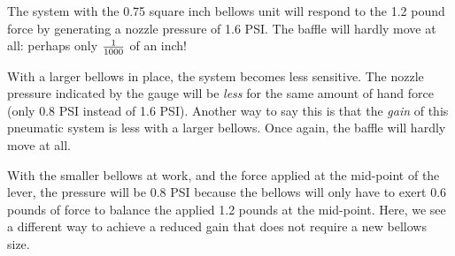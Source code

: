 
The system with the 0.75 square inch bellows unit will respond to the 1.2 pound force by generating a nozzle pressure of 1.6 PSI.  The baffle will hardly move at all: perhaps only $1 \over 1000$ of an inch!

\vskip 10pt

With a larger bellows in place, the system becomes less sensitive.  The nozzle pressure indicated by the gauge will be {\it less} for the same amount of hand force (only 0.8 PSI instead of 1.6 PSI).  Another way to say this is that the {\it gain} of this pneumatic system is less with a larger bellows.  Once again, the baffle will hardly move at all.

\vskip 10pt

With the smaller bellows at work, and the force applied at the mid-point of the lever, the pressure will be 0.8 PSI because the bellows will only have to exert 0.6 pounds of force to balance the applied 1.2 pounds at the mid-point.  Here, we see a different way to achieve a reduced gain that does not require a new bellows size.











